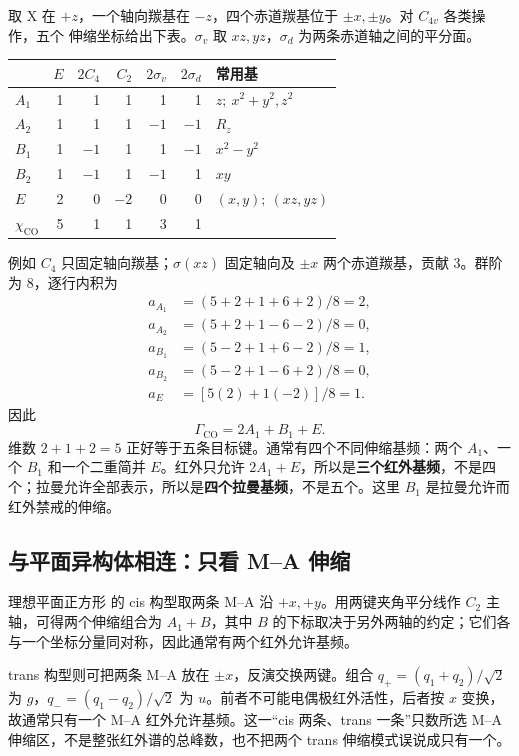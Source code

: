 \begin{worked}[$C_{4v}$ 的 \ce{M(CO)5X}]
取 X 在 $+z$，一个轴向羰基在 $-z$，四个赤道羰基位于 $\pm x,\pm y$。对 $C_{4v}$ 各类操作，五个  伸缩坐标给出下表。$\sigma_v$ 取 $xz,yz$，$\sigma_d$ 为两条赤道轴之间的平分面。
\begin{center}
\small
\begin{tabular}{lrrrrrl}
\toprule
 & $E$ & $2C_4$ & $C_2$ & $2\sigma_v$ & $2\sigma_d$ & 常用基\\
\midrule
$A_1$ & 1 & 1 & 1 & 1 & 1 & $z;\ x^2+y^2,z^2$\\
$A_2$ & 1 & 1 & 1 & $-1$ & $-1$ & $R_z$\\
$B_1$ & 1 & $-1$ & 1 & 1 & $-1$ & $x^2-y^2$\\
$B_2$ & 1 & $-1$ & 1 & $-1$ & 1 & $xy$\\
$E$ & 2 & 0 & $-2$ & 0 & 0 & $(x,y);\ (xz,yz)$\\
\midrule
$\chi_{\mathrm{CO}}$ & 5 & 1 & 1 & 3 & 1 & \\
\bottomrule
\end{tabular}
\end{center}
例如 $C_4$ 只固定轴向羰基；$\sigma(xz)$ 固定轴向及 $\pm x$ 两个赤道羰基，贡献 3。群阶为 8，逐行内积为
\begin{align*}
a_{A_1}&=(5+2+1+6+2)/8=2,\\
a_{A_2}&=(5+2+1-6-2)/8=0,\\
a_{B_1}&=(5-2+1+6-2)/8=1,\\
a_{B_2}&=(5-2+1-6+2)/8=0,\\
a_E&=[5(2)+1(-2)]/8=1.
\end{align*}
因此
\[
\boxed{\Gamma_{\mathrm{CO}}=2A_1+B_1+E}.
\]
维数 $2+1+2=5$ 正好等于五条目标键。通常有四个不同伸缩基频：两个 $A_1$、一个 $B_1$ 和一个二重简并 $E$。红外只允许 $2A_1+E$，所以是\textbf{三个红外基频}，不是四个；拉曼允许全部表示，所以是\textbf{四个拉曼基频}，不是五个。这里 $B_1$ 是拉曼允许而红外禁戒的伸缩。
\end{worked}

\subsection{与平面异构体相连：只看 M--A 伸缩}

理想平面正方形  的 cis 构型取两条 M--A 沿 $+x,+y$。用两键夹角平分线作 $C_2$ 主轴，可得两个伸缩组合为 $A_1+B$，其中 $B$ 的下标取决于另外两轴的约定；它们各与一个坐标分量同对称，因此通常有两个红外允许基频。

trans 构型则可把两条 M--A 放在 $\pm x$，反演交换两键。组合 $q_+=(q_1+q_2)/\sqrt2$ 为 $g$，$q_-=(q_1-q_2)/\sqrt2$ 为 $u$。前者不可能电偶极红外活性，后者按 $x$ 变换，故通常只有一个 M--A 红外允许基频。这一“cis 两条、trans 一条”只数所选 M--A 伸缩区，不是整张红外谱的总峰数，也不把两个 trans 伸缩模式误说成只有一个。

